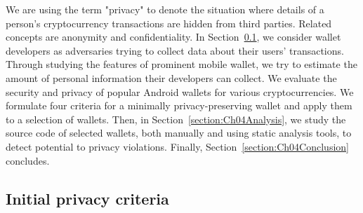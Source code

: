 We are using the term "privacy" to denote the situation where details of a person's cryptocurrency transactions are hidden from third parties.
Related concepts are anonymity and confidentiality.
In Section~\ref{section:Ch04Initialprivacycriteria}, we consider wallet developers as adversaries trying to collect data about their users' transactions.
Through studying the features of prominent mobile wallet, we try to estimate the amount of personal information their developers can collect.
We evaluate the security and privacy of popular Android wallets for various cryptocurrencies.
We formulate four criteria for a minimally privacy-preserving wallet and apply them to a selection of wallets.
Then, in Section~\ref{section:Ch04Analysis}, we study the source code of selected wallets, both manually and using static analysis tools, to detect potential to privacy violations.
Finally, Section~\ref{section:Ch04Conclusion} concludes.

\subsection{Initial privacy criteria} \label{section:Ch04Initialprivacycriteria}

